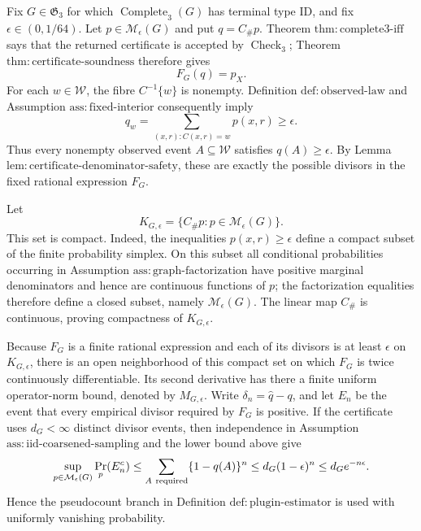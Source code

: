 Fix \(G\in\mathfrak G_3\) for which \(\operatorname{Complete}_3(G)\) has terminal type \(\mathrm{ID}\), and fix \(\epsilon\in(0,1/64)\). Let \(p\in\mathcal M_\epsilon(G)\) and put \(q=C_\#p\). Theorem \(\mathrm{thm{:}complete3\text{-}iff}\) says that the returned certificate is accepted by \(\operatorname{Check}_3\); Theorem \(\mathrm{thm{:}certificate\text{-}soundness}\) therefore gives
\[
F_G(q)=p_X.
\]
For each \(w\in\mathcal W\), the fibre \(C^{-1}\{w\}\) is nonempty. Definition \(\mathrm{def{:}observed\text{-}law}\) and Assumption \(\mathrm{ass{:}fixed\text{-}interior}\) consequently imply
\[
q_w=\sum_{(x,r):C(x,r)=w}p(x,r)\geq\epsilon.
\]
Thus every nonempty observed event \(A\subseteq\mathcal W\) satisfies \(q(A)\geq\epsilon\). By Lemma \(\mathrm{lem{:}certificate\text{-}denominator\text{-}safety}\), these are exactly the possible divisors in the fixed rational expression \(F_G\).

Let
\[
K_{G,\epsilon}=\{C_\#p:p\in\mathcal M_\epsilon(G)\}.
\]
This set is compact. Indeed, the inequalities \(p(x,r)\geq\epsilon\) define a compact subset of the finite probability simplex. On this subset all conditional probabilities occurring in Assumption \(\mathrm{ass{:}graph\text{-}factorization}\) have positive marginal denominators and hence are continuous functions of \(p\); the factorization equalities therefore define a closed subset, namely \(\mathcal M_\epsilon(G)\). The linear map \(C_\#\) is continuous, proving compactness of \(K_{G,\epsilon}\).

Because \(F_G\) is a finite rational expression and each of its divisors is at least \(\epsilon\) on \(K_{G,\epsilon}\), there is an open neighborhood of this compact set on which \(F_G\) is twice continuously differentiable. Its second derivative has there a finite uniform operator-norm bound, denoted by \(M_{G,\epsilon}\). Write \(\delta_n=\widehat q-q\), and let \(E_n\) be the event that every empirical divisor required by \(F_G\) is positive. If the certificate uses \(d_G<\infty\) distinct divisor events, then independence in Assumption \(\mathrm{ass{:}iid\text{-}coarsened\text{-}sampling}\) and the lower bound above give
\[
\sup_{p\in\mathcal M_\epsilon(G)}\Pr_p(E_n^c)
\leq \sum_{A\ {\rm required}}\{1-q(A)\}^n
\leq d_G(1-\epsilon)^n
\leq d_G e^{-n\epsilon}.
\]
Hence the pseudocount branch in Definition \(\mathrm{def{:}plugin\text{-}estimator}\) is used with uniformly vanishing probability.


